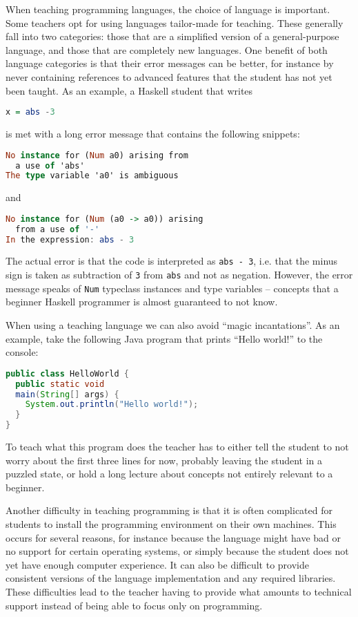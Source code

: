 When teaching programming languages, the choice of language is important.  Some
teachers opt for using languages tailor-made for teaching. These generally fall
into two categories: those that are a simplified version of a general-purpose
language, and those that are completely new languages. One benefit of both
language categories is that their error messages can be better, for instance by
never containing references to advanced features that the student has not yet
been taught. As an example, a Haskell student that writes
\begin{lstlisting}[language=Haskell, basicstyle=\footnotesize]
x = abs -3
\end{lstlisting}
is met with a long error message that contains the following snippets:
\begin{lstlisting}[language=Haskell, basicstyle=\footnotesize]
No instance for (Num a0) arising from
  a use of 'abs'
The type variable 'a0' is ambiguous
\end{lstlisting}
and
\begin{lstlisting}[language=Haskell, basicstyle=\footnotesize]
No instance for (Num (a0 -> a0)) arising
  from a use of '-'
In the expression: abs - 3
\end{lstlisting}
The actual error is that the code is interpreted as \texttt{abs - 3}, i.e.
that the minus sign is taken as subtraction of \texttt{3} from \texttt{abs} and
not as negation.  However, the error message speaks of \texttt{Num} typeclass
instances and type variables -- concepts that a beginner Haskell programmer is
almost guaranteed to not know.

When using a teaching language we can also avoid ``magic incantations''. As an
example, take the following Java program that prints ``Hello world!'' to the
console:
\begin{lstlisting}[language=Java, basicstyle=\footnotesize]
public class HelloWorld {
  public static void
  main(String[] args) {
    System.out.println("Hello world!");
  }
}
\end{lstlisting}
To teach what this program does the teacher has to either tell the student to
not worry about the first three lines for now, probably leaving the student in
a puzzled state, or hold a long lecture about concepts not entirely relevant to
a beginner.

Another difficulty in teaching programming is that it is often complicated for
students to install the programming environment on their own machines. This
occurs for several reasons, for instance because the language might have bad or
no support for certain operating systems, or simply because the student does 
not yet have enough computer experience. It can also be difficult to provide
consistent versions of the language implementation and any required libraries.
These difficulties lead to the teacher having to provide what amounts to
technical support instead of being able to focus only on programming.
